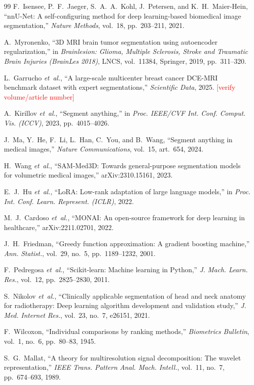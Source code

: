 \documentclass[journal]{IEEEtran}
\newcommand{\todo}[1]{\textcolor{red}{[#1]}}
\begin{document}
\begin{thebibliography}{99}
F.~Isensee, P.~F.~Jaeger, S.~A.~A.~Kohl, J.~Petersen, and K.~H.~Maier-Hein, ``nnU-Net: A self-configuring method for deep learning-based biomedical image segmentation,'' \emph{Nature Methods}, vol.~18, pp.~203--211, 2021.

A.~Myronenko, ``3D MRI brain tumor segmentation using autoencoder regularization,'' in \emph{Brainlesion: Glioma, Multiple Sclerosis, Stroke and Traumatic Brain Injuries (BrainLes 2018)}, LNCS, vol.~11384, Springer, 2019, pp.~311--320.

L.~Garrucho \emph{et~al.}, ``A large-scale multicenter breast cancer DCE-MRI benchmark dataset with expert segmentations,'' \emph{Scientific Data}, 2025. \todo{verify volume/article number}

A.~Kirillov \emph{et~al.}, ``Segment anything,'' in \emph{Proc. IEEE/CVF Int. Conf. Comput. Vis. (ICCV)}, 2023, pp.~4015--4026.

J.~Ma, Y.~He, F.~Li, L.~Han, C.~You, and B.~Wang, ``Segment anything in medical images,'' \emph{Nature Communications}, vol.~15, art.~654, 2024.

H.~Wang \emph{et~al.}, ``SAM-Med3D: Towards general-purpose segmentation models for volumetric medical images,'' arXiv:2310.15161, 2023.

E.~J.~Hu \emph{et~al.}, ``LoRA: Low-rank adaptation of large language models,'' in \emph{Proc. Int. Conf. Learn. Represent. (ICLR)}, 2022.

M.~J.~Cardoso \emph{et~al.}, ``MONAI: An open-source framework for deep learning in healthcare,'' arXiv:2211.02701, 2022.

J.~H.~Friedman, ``Greedy function approximation: A gradient boosting machine,'' \emph{Ann. Statist.}, vol.~29, no.~5, pp.~1189--1232, 2001.

F.~Pedregosa \emph{et~al.}, ``Scikit-learn: Machine learning in Python,'' \emph{J. Mach. Learn. Res.}, vol.~12, pp.~2825--2830, 2011.

S.~Nikolov \emph{et~al.}, ``Clinically applicable segmentation of head and neck anatomy for radiotherapy: Deep learning algorithm development and validation study,'' \emph{J. Med. Internet Res.}, vol.~23, no.~7, e26151, 2021.

F.~Wilcoxon, ``Individual comparisons by ranking methods,'' \emph{Biometrics Bulletin}, vol.~1, no.~6, pp.~80--83, 1945.

S.~G.~Mallat, ``A theory for multiresolution signal decomposition: The wavelet representation,'' \emph{IEEE Trans. Pattern Anal. Mach. Intell.}, vol.~11, no.~7, pp.~674--693, 1989.
\end{thebibliography}
\end{document}
